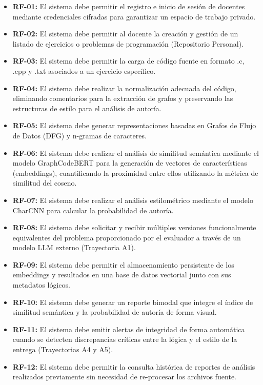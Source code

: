 \begin{itemize}
    \item \textbf{RF-01:} El sistema debe permitir el registro e inicio de sesión de docentes mediante credenciales cifradas para garantizar un espacio de trabajo privado.
    
    \item \textbf{RF-02:} El sistema debe permitir al docente la creación y gestión de un listado de ejercicios o problemas de programación (Repositorio Personal).
    
    \item \textbf{RF-03:} El sistema debe permitir la carga de código fuente en formato .c, .cpp y .txt asociados a un ejercicio específico.
    
    \item \textbf{RF-04:} El sistema debe realizar la normalización adecuada del código, eliminando comentarios para la extracción de grafos y preservando las estructuras de estilo para el análisis de autoría.
    
    \item \textbf{RF-05:} El sistema debe generar representaciones basadas en Grafos de Flujo de Datos (DFG) y n-gramas de caracteres.
    
    \item \textbf{RF-06:} El sistema debe realizar el análisis de similitud semántica mediante el modelo GraphCodeBERT para la generación de vectores de características (embeddings), cuantificando la proximidad entre ellos utilizando la métrica de similitud del coseno.
    
    \item \textbf{RF-07:} El sistema debe realizar el análisis estilométrico mediante el modelo CharCNN para calcular la probabilidad de autoría.
    
    \item \textbf{RF-08:} El sistema debe solicitar y recibir múltiples versiones funcionalmente equivalentes del problema proporcionado por el evaluador a través de un modelo LLM externo (Trayectoria A1).
    
    \item \textbf{RF-09:} El sistema debe permitir el almacenamiento persistente de los embeddings y resultados en una base de datos vectorial junto con sus metadatos lógicos.
    
    \item \textbf{RF-10:} El sistema debe generar un reporte bimodal que integre el índice de similitud semántica y la probabilidad de autoría de forma visual.
    
    \item \textbf{RF-11:} El sistema debe emitir alertas de integridad de forma automática cuando se detecten discrepancias críticas entre la lógica y el estilo de la entrega (Trayectorias A4 y A5).
    
    \item \textbf{RF-12:} El sistema debe permitir la consulta histórica de reportes de análisis realizados previamente sin necesidad de re-procesar los archivos fuente.
\end{itemize}

